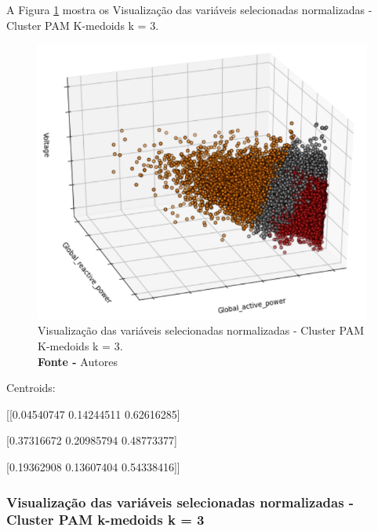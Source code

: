  A Figura \ref{fig: Visualização das variáveis selecionadas normalizadas - Cluster PAM K-medoids k = 3} mostra os Visualização das variáveis selecionadas normalizadas - Cluster PAM K-medoids k = 3.
\begin{figure}[H]
    \centering
    \includegraphics[width=0.99\textwidth]{Figuras/4. Resultados e Discussões/Exer4/Visualização das variáveis selecionadas normalizadas - Cluster PAM K-medoids k = 3.jpg}
    \caption{Visualização das variáveis selecionadas normalizadas - Cluster PAM K-medoids k = 3.\\ \textbf{Fonte -} Autores}
    \label{fig: Visualização das variáveis selecionadas normalizadas - Cluster PAM K-medoids k = 3}
\end{figure}

Centroids:

[[0.04540747 0.14244511 0.62616285]

 [0.37316672 0.20985794 0.48773377]
 
 [0.19362908 0.13607404 0.54338416]]

\subsubsection{Visualização das variáveis selecionadas normalizadas - Cluster PAM k-medoids k = 3}

